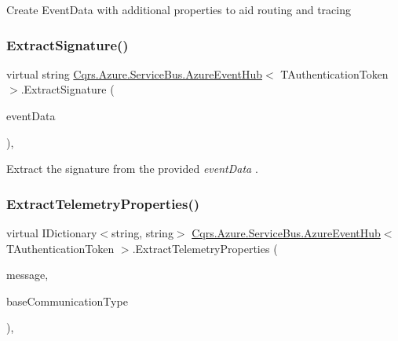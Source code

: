 Create Event\+Data with additional properties to aid routing and tracing 

\mbox{\label{classCqrs_1_1Azure_1_1ServiceBus_1_1AzureEventHub_ac22def26cc02c95c6337be7d87854192_ac22def26cc02c95c6337be7d87854192}} 
\subsubsection{\texorpdfstring{Extract\+Signature()}{ExtractSignature()}}
{\footnotesize\ttfamily virtual string \hyperlink{classCqrs_1_1Azure_1_1ServiceBus_1_1AzureEventHub}{Cqrs.\+Azure.\+Service\+Bus.\+Azure\+Event\+Hub}$<$ T\+Authentication\+Token $>$.Extract\+Signature (\begin{DoxyParamCaption}\item[{Event\+Data}]{event\+Data }\end{DoxyParamCaption})\hspace{0.3cm}{\ttfamily [protected]}, {\ttfamily [virtual]}}



Extract the signature from the provided {\itshape event\+Data} . 

\mbox{\label{classCqrs_1_1Azure_1_1ServiceBus_1_1AzureEventHub_a913284b0c4d40aa59c20c277b45429e5_a913284b0c4d40aa59c20c277b45429e5}} 
\subsubsection{\texorpdfstring{Extract\+Telemetry\+Properties()}{ExtractTelemetryProperties()}}
{\footnotesize\ttfamily virtual I\+Dictionary$<$string, string$>$ \hyperlink{classCqrs_1_1Azure_1_1ServiceBus_1_1AzureEventHub}{Cqrs.\+Azure.\+Service\+Bus.\+Azure\+Event\+Hub}$<$ T\+Authentication\+Token $>$.Extract\+Telemetry\+Properties (\begin{DoxyParamCaption}\item[{Event\+Data}]{message,  }\item[{string}]{base\+Communication\+Type }\end{DoxyParamCaption})\hspace{0.3cm}{\ttfamily [protected]}, {\ttfamily [virtual]}}



